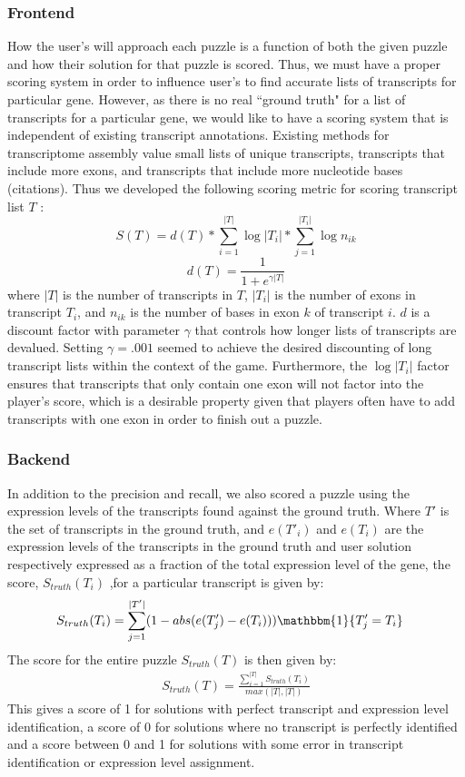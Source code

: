 \documentclass[12pt]{article}
\begin{document}
\subsubsection*{Frontend}
How the user's will approach each puzzle is a function of both the given puzzle and how their solution for that puzzle is scored. Thus, we must have
a proper scoring system in order to influence user's to find accurate lists of transcripts for particular gene. However, as there is no real ``ground truth"
for a list of transcripts for a particular gene, we would like to have a scoring system that is independent of existing transcript annotations. Existing methods
for transcriptome assembly value small lists of unique transcripts, transcripts that include more exons, and transcripts that include more nucleotide bases (citations).
Thus we developed the following scoring metric for scoring transcript list $T$ :
\begin{equation*}
S(T) = d(T) * \sum_{i=1}^{|T|} \log{|T_i|} * \sum_{j = 1}^{|T_i|} \log{n_{ik}}
\end{equation*}
\begin{equation*}
d(T) = \frac{1}{1+e^{\gamma |T|}}
\end{equation*}
where $|T|$ is the number of transcripts in $T$, $|T_i|$ is the number of exons in transcript $T_i$, and $n_{ik}$ is the number of bases in exon $k$ of transcript $i$.
$d$ is a discount factor with parameter $\gamma$ that controls how longer lists of transcripts are devalued. Setting $\gamma = .001$ seemed to achieve the desired
discounting of long transcript lists within the context of the game. Furthermore, the $\log{|T_i|}$ factor ensures that transcripts that only contain one exon will not factor
into the player's score, which is a desirable property given that players often have to add transcripts with one exon in order to finish out a puzzle.
\subsubsection{Backend}
In addition to the precision and recall, we also scored a puzzle using the expression levels of the transcripts found against the ground truth. Where $T'$ is the set of transcripts in the ground truth, and $e(T'_i)$ and $e(T_i)$ are the expression levels of the transcripts in the ground truth and user solution respectively expressed as a fraction of the total expression level of the gene, the score, $S_{truth}(T_i)$ ,for a particular transcript is given by:
\begin{align*}
S_{truth}(T_i) &= \sum\limits_{j = 1}^{|T'|}(1 - abs(e(T'_j) - e(T_i)))\mathbbm{1}\{T'_j = T_i\} 
\end{align*}
The score for the entire puzzle $S_{truth}(T)$ is then given by:
\begin{align*}
S_{truth}(T) = \frac{\sum\limits_{i=1}^{|T|} S_{truth}(T_i)}{max(|T|, |T|)}
\end{align*}
This gives a score of 1 for solutions with perfect transcript and expression level identification, a score of 0 for solutions where no transcript is perfectly identified and a score between 0 and 1 for solutions with some error in transcript identification or expression level assignment.
\end{document}
